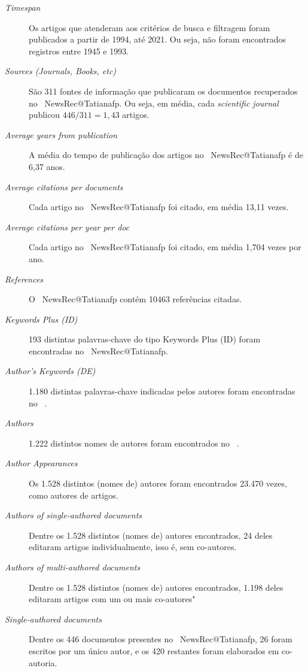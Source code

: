 \begin{description}
    \item [\textit{Timespan}]  Os artigos que atenderam aos critérios de busca e filtragem foram publicados a partir de 1994, até 2021. Ou seja, não foram encontrados registros entre 1945 e 1993.
    \item [\textit{Sources (Journals, Books, etc)}] São 311 fontes de informação que publicaram os documentos recuperados no \dataset\  NewsRec@Tatianafp. Ou seja, em média, cada \textit{scientific journal} publicou $446/311=1,43$ artigos. 
    \item [\textit{Average years from publication}] A média do tempo de publicação dos artigos no \dataset\  NewsRec@Tatianafp é de 6,37 anos.
    \item [\textit{Average citations per documents}] Cada artigo no \dataset\   NewsRec@Tatianafp  foi citado, em média 13,11 vezes.
    \item [\textit{Average citations per year per doc}] Cada artigo no \dataset\   NewsRec@Tatianafp  foi citado, em média 1,704 vezes por ano.
    \item [\textit{References}] O \dataset\  NewsRec@Tatianafp contém 10463 referências citadas.
    \item [\textit{Keywords Plus (ID)}] 193 distintas palavras-chave do tipo Keywords Plus (ID) foram encontradas no \dataset\ NewsRec@Tatianafp. 
    \item [\textit{Author's Keywords (DE)}] 1.180 distintas palavras-chave indicadas pelos autores foram encontradas no \dataset\ .
    \item [\textit{Authors}] 1.222 distintos nomes de autores foram encontrados no \dataset\ .
    \item [\textit{Author Appearances}] Os 1.528 distintos (nomes de) autores foram encontrados 23.470 vezes, como autores de artigos.
    \item [\textit{Authors of single-authored documents}] Dentre os 1.528 distintos (nomes de) autores encontrados, 24 deles editaram artigos individualmente, isso é, sem co-autores.
    \item [\textit{Authors of multi-authored documents}] Dentre os 1.528 distintos (nomes de) autores encontrados, 1.198 deles editaram artigos com um ou mais co-autores"
    \item [\textit{Single-authored documents}] Dentre os 446 documentos presentes no \dataset\   NewsRec@Tatianafp, 26 foram escritos por um único autor, e os 420 restantes foram elaborados em co-autoria.

\end{description}
